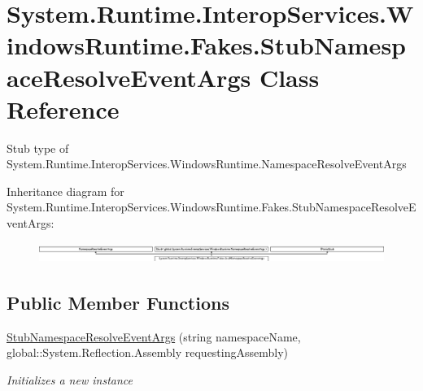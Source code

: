 \hypertarget{class_system_1_1_runtime_1_1_interop_services_1_1_windows_runtime_1_1_fakes_1_1_stub_namespace_resolve_event_args}{\section{System.\-Runtime.\-Interop\-Services.\-Windows\-Runtime.\-Fakes.\-Stub\-Namespace\-Resolve\-Event\-Args Class Reference}
\label{class_system_1_1_runtime_1_1_interop_services_1_1_windows_runtime_1_1_fakes_1_1_stub_namespace_resolve_event_args}
}


Stub type of System.\-Runtime.\-Interop\-Services.\-Windows\-Runtime.\-Namespace\-Resolve\-Event\-Args 


Inheritance diagram for System.\-Runtime.\-Interop\-Services.\-Windows\-Runtime.\-Fakes.\-Stub\-Namespace\-Resolve\-Event\-Args\-:\begin{figure}[H]
\begin{center}
\leavevmode
\includegraphics[height=0.663114cm]{class_system_1_1_runtime_1_1_interop_services_1_1_windows_runtime_1_1_fakes_1_1_stub_namespace_resolve_event_args}
\end{center}
\end{figure}
\subsection*{Public Member Functions}
\begin{DoxyCompactItemize}
\item 
\hyperlink{class_system_1_1_runtime_1_1_interop_services_1_1_windows_runtime_1_1_fakes_1_1_stub_namespace_resolve_event_args_a609491daf18f5afaed1e26fddfcb55cf}{Stub\-Namespace\-Resolve\-Event\-Args} (string namespace\-Name, global\-::\-System.\-Reflection.\-Assembly requesting\-Assembly)
\begin{DoxyCompactList}\small\item\em Initializes a new instance\end{DoxyCompactList}\end{DoxyCompactItemize}
